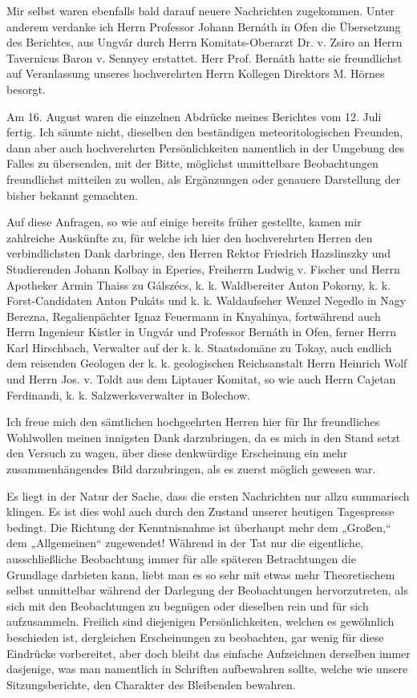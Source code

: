 \documentclass[a4paper, 11pt, oneside, german]{article}
\begin{document}
Mir selbst waren ebenfalls bald darauf neuere Nachrichten zugekommen. Unter anderem verdanke ich Herrn Professor Johann Bernáth in Ofen die Übersetzung des Berichtes, aus Ungvár durch Herrn Komitats-Oberarzt Dr. v. Zsiro an Herrn Tavernicus Baron v. Sennyey erstattet. Herr Prof. Bernáth hatte sie freundlichst auf Veranlassung unseres hochverehrten Herrn Kollegen Direktors M. Hörnes besorgt.

Am 16. August waren die einzelnen Abdrücke meines Berichtes vom 12. Juli fertig. Ich säumte nicht, dieselben den beständigen meteoritologischen Freunden, dann aber auch hochverehrten Persönlichkeiten namentlich in der Umgebung des Falles zu übersenden, mit der Bitte, möglichst unmittelbare Beobachtungen freundlichst mitteilen zu wollen, als Ergänzungen oder genauere Darstellung der bisher bekannt gemachten.

Auf diese Anfragen, so wie auf einige bereits früher gestellte, kamen mir zahlreiche Auskünfte zu, für welche ich hier den hochverehrten Herren den verbindlichsten Dank darbringe, den Herren Rektor Friedrich Hazslinszky und Studierenden Johann Kolbay in Eperies, Freiherrn Ludwig v. Fischer und Herrn Apotheker Armin Thaiss zu Gálszécs, k. k. Waldbereiter Anton Pokorny, k. k. Forst-Candidaten Anton Pukáts und k. k. Waldaufseher Wenzel Negedlo in Nagy Berezna, Regalienpächter Ignaz Feuermann in Knyahinya, fortwährend auch Herrn Ingenieur Kistler in Ungvár und Professor Bernáth in Ofen, ferner Herrn Karl Hirschbach, Verwalter auf der k. k. Staatsdomäne zu Tokay, auch endlich dem reisenden Geologen der k. k. geologischen Reichsanstalt Herrn Heinrich Wolf und Herrn Jos. v. Toldt aus dem Liptauer Komitat, so wie auch Herrn Cajetan Ferdinandi, k. k. Salzwerksverwalter in Bolechow.

Ich freue mich den sämtlichen hochgeehrten Herren hier für Ihr freundliches Wohlwollen meinen innigsten Dank darzubringen, da es mich in den Stand setzt den Versuch zu wagen, über diese denkwürdige Erscheinung ein mehr zusammenhängendes Bild darzubringen, als es zuerst möglich gewesen war.

Es liegt in der Natur der Sache, dass die ersten Nachrichten nur allzu summarisch klingen. Es ist dies wohl auch durch den Zustand unserer heutigen Tagespresse bedingt. Die Richtung der Kenntnisnahme ist überhaupt mehr dem „Großen,“ dem „Allgemeinen“ zugewendet! Während in der Tat nur die eigentliche, ausschließliche Beobachtung immer für alle späteren Betrachtungen die Grundlage darbieten kann, liebt man es so sehr mit etwas mehr Theoretischem selbst unmittelbar während der Darlegung der Beobachtungen hervorzutreten, als sich mit den Beobachtungen zu begnügen oder dieselben rein und für sich aufzusammeln. Freilich sind diejenigen Persönlichkeiten, welchen es gewöhnlich beschieden ist, dergleichen Erscheinungen zu beobachten, gar wenig für diese Eindrücke vorbereitet, aber doch bleibt das einfache Aufzeichnen derselben immer dasjenige, was man namentlich in Schriften aufbewahren sollte, welche wie unsere Sitzungsberichte, den Charakter des Bleibenden bewahren.
\end{document}
